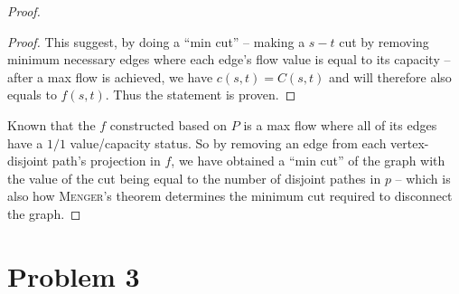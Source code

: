 \documentclass[11pt]{article}
\begin{document}
\begin{proof}
\begin{adjustwidth}{1cm}{}
\begin{proof}
    This suggest, by doing a ``min cut'' -- making a $s-t$ cut by removing minimum necessary edges where each edge's flow value is equal to its capacity -- after a max flow is achieved, we have $c(s, t) = C(s, t)$ and will therefore also equals to $f(s, t)$. Thus the statement is proven.


    \end{proof}

    \end{adjustwidth}



Known that the $f$ constructed based on $P$ is a max flow where all of its edges have a $1/1$ value/capacity status. So by removing an edge from each vertex-disjoint path's projection in $f$, we have obtained a ``min cut'' of the graph with the value of the cut being equal to the number of disjoint pathes in $p$ -- which is also how \textsc{Menger}'s theorem determines the minimum cut required to disconnect the graph.

\end{proof}

\section*{Problem 3}




%
% 
% 
\end{document}
